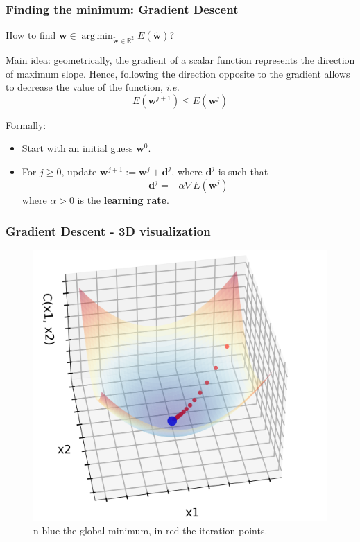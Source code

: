 \documentclass{beamer}
\DeclareMathOperator*{\argmin}{arg\,min}
\begin{document}
	\begin{frame}
		\frametitle{Finding the minimum: Gradient Descent}
		How to find $\bm{w} \in \argmin_{\tilde{\bm{w}} \in \mathbb{R}^2} E(\tilde{\bm{w}})$?
		
		\vspace{5mm}
		
		Main idea: geometrically, the gradient of a scalar function represents the direction of maximum slope. Hence, following the direction opposite to the gradient allows to decrease the value of the function, \textit{i.e.}
		\begin{equation*}
			E(\bm{w}^{j+1}) \leq E(\bm{w}^j) 
		\end{equation*}
		
		\vspace{5mm}
		
		Formally:
		\begin{itemize}
			\item Start with an initial guess $\bm{w}^0$.
			\item For $j \geq 0$, update $\bm{w}^{j+1} := \bm{w}^{j} + \bm{d}^j$, where $\bm{d}^j$ is such that
			$$\bm{d}^j = - \alpha \nabla E(\bm{w}^j)$$
			where $\alpha>0$ is the \textbf{learning rate}.
		\end{itemize}
	
	\end{frame}

	\begin{frame}
		\frametitle{Gradient Descent - 3D visualization}
		\begin{figure}
			\centering
			\includegraphics[scale=0.4]{images/gradient_descent_3D}
			\caption{n blue the global minimum, in red the iteration points.}
		\end{figure}
	\end{frame}
\end{document}
